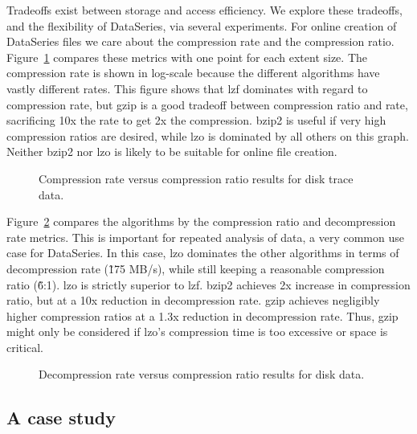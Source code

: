 \documentclass{acm_proc_article-sp}
\begin{document}
Tradeoffs exist between storage and access efficiency.  We
explore these tradeoffs, and the flexibility of DataSeries, via
several experiments.
For online creation of DataSeries files we care about the compression
rate and the compression ratio.
Figure~\ref{fig:comRateRatios} compares these metrics
with one point for each extent size.  The compression rate is shown
in log-scale because the different algorithms have vastly different rates.
This figure shows that lzf dominates
with regard to compression rate, but gzip is a good tradeoff between
compression ratio and rate, sacrificing 10x the rate to get 2x
the compression.  bzip2 is useful if very high compression
ratios are desired, while lzo is dominated by all others on this graph.
Neither bzip2 nor lzo is likely to be suitable for online file creation.


\begin{figure}[tbh]
\caption{ Compression rate versus compression ratio results for disk trace data.}
\label{fig:comRateRatios}
\end{figure}

Figure~\ref{fig:decomRateRatios} compares the algorithms by the
compression ratio and decompression rate metrics.  This is important
for repeated analysis of data, a very common use case for
DataSeries.  In this case, lzo dominates the other algorithms in
terms of decompression rate (\~175 MB/s), while still keeping a
reasonable compression ratio (\~6:1). lzo is strictly superior to lzf.
bzip2 achieves 
2x increase in compression ratio, but at a 
10x
reduction in decompression rate.  gzip achieves negligibly higher
compression ratios at a 
1.3x reduction in decompression rate.
Thus, gzip might only be considered if
lzo's compression time is too excessive or space is critical.

\begin{figure}[tbh]
\caption{ Decompression rate versus compression ratio results for disk data.}
\label{fig:decomRateRatios}
\end{figure}

\subsection{A case study}\label{sec:ellard}
\end{document}
